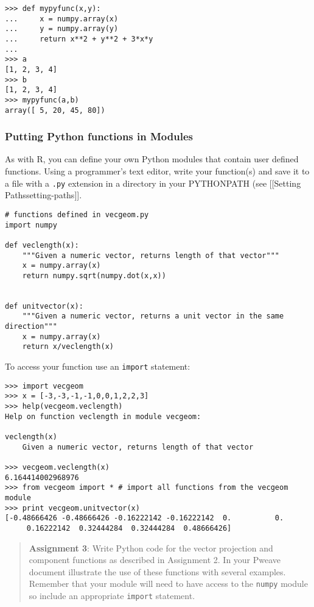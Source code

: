 \begin{lstlisting}
>>> def mypyfunc(x,y):
...     x = numpy.array(x)
...     y = numpy.array(y)
...     return x**2 + y**2 + 3*x*y
... 
>>> a
[1, 2, 3, 4]
>>> b
[1, 2, 3, 4]
>>> mypyfunc(a,b)
array([ 5, 20, 45, 80])
\end{lstlisting}
\subsubsection{Putting Python functions in Modules}

As with R, you can define your own Python modules that contain user
defined functions. Using a programmer's text editor, write your
function(s) and save it to a file with a \lstinline!.py! extension in a
directory in your PYTHONPATH (see {[}{[}Setting
Paths\textbar{}setting-paths{]}{]}.

\begin{lstlisting}
# functions defined in vecgeom.py
import numpy

def veclength(x):
    """Given a numeric vector, returns length of that vector""" 
    x = numpy.array(x)
    return numpy.sqrt(numpy.dot(x,x))


def unitvector(x):
    """Given a numeric vector, returns a unit vector in the same direction"""
    x = numpy.array(x)
    return x/veclength(x)
\end{lstlisting}
To access your function use an \lstinline!import! statement:

\begin{lstlisting}
>>> import vecgeom
>>> x = [-3,-3,-1,-1,0,0,1,2,2,3]
>>> help(vecgeom.veclength)
Help on function veclength in module vecgeom:

veclength(x)
    Given a numeric vector, returns length of that vector

>>> vecgeom.veclength(x)
6.164414002968976
>>> from vecgeom import * # import all functions from the vecgeom module
>>> print vecgeom.unitvector(x)
[-0.48666426 -0.48666426 -0.16222142 -0.16222142  0.          0.   
     0.16222142  0.32444284  0.32444284  0.48666426]
\end{lstlisting}
\begin{quote}
\textbf{Assignment 3}: Write Python code for the vector projection and
component functions as described in Assignment 2. In your Pweave
document illustrate the use of these functions with several examples.
Remember that your module will need to have access to the
\lstinline!numpy! module so include an appropriate \lstinline!import!
statement.

\end{quote}
